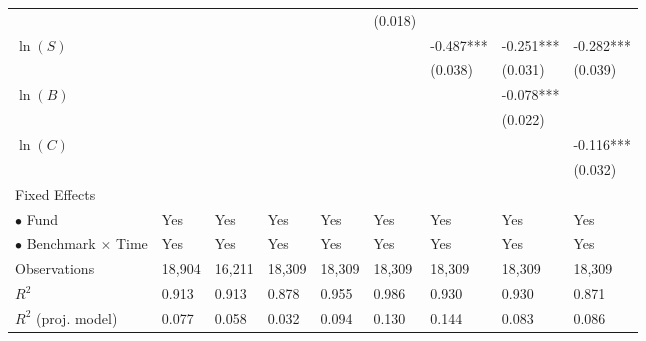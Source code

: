 \documentclass[openany]{book}
\theoremstyle{definition}
\theoremstyle{definition}
\theoremstyle{definition}
\theoremstyle{remark}
\begin{document}
\begin{table}[ht]
\begin{tabularx}{0.975\textwidth}{lYYYYYYYY}
   &  &  &  &  & (0.018) &  &  &  \\ 
  $\ln(S)$ &  &  &  &  &  & -0.487*** & -0.251*** & -0.282*** \\ 
   &  &  &  &  &  & (0.038) & (0.031) & (0.039) \\ 
  $\ln(B)$ &  &  &  &  &  &  & -0.078*** &  \\ 
   &  &  &  &  &  &  & (0.022) &  \\ 
  $\ln(C)$ &  &  &  &  &  &  &  & -0.116*** \\ 
   &  &  &  &  &  &  &  & (0.032) \\ 
  Fixed Effects &  &  &  &  &  &  &  &  \\ 
  $\bullet$ Fund & Yes & Yes & Yes & Yes & Yes & Yes & Yes & Yes \\ 
  $\bullet$ Benchmark $\times$ Time & Yes & Yes & Yes & Yes & Yes & Yes & Yes & Yes \\ 
  Observations & 18,904 & 16,211 & 18,309 & 18,309 & 18,309 & 18,309 & 18,309 & 18,309 \\ 
  $R^2$ & 0.913 & 0.913 & 0.878 & 0.955 & 0.986 & 0.930 & 0.930 & 0.871 \\ 
  $R^2$ (proj. model) & 0.077 & 0.058 & 0.032 & 0.094 & 0.130 & 0.144 & 0.083 & 0.086 \\ 
   \bottomrule
\end{tabularx}
\endgroup
\end{table}
\end{document}
